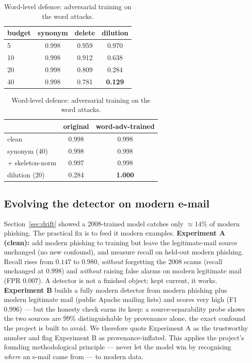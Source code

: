 \documentclass[11pt]{article}
\begin{document}
\begin{table}[t]
\centering
\begin{minipage}[t]{0.48\textwidth}\centering
\caption{Union recall under word-level attacks, by budget (words changed/inserted).}
\label{tab:wordatk}
\begin{tabular}{lccc}
\toprule
budget & synonym & delete & dilution \\
\midrule
5  & 0.998 & 0.959 & 0.970 \\
10 & 0.998 & 0.912 & 0.638 \\
20 & 0.998 & 0.809 & 0.284 \\
40 & 0.998 & 0.781 & \textbf{0.129} \\
\bottomrule
\end{tabular}
\end{minipage}\hfill
\begin{minipage}[t]{0.48\textwidth}\centering
\caption{Word-level defence: adversarial training on the word attacks.}
\label{tab:worddef}
\begin{tabular}{lcc}
\toprule
 & original & word-adv-trained \\
\midrule
clean            & 0.998 & 0.998 \\
synonym (40)     & 0.998 & 0.998 \\
\;+ skeleton-norm & 0.997 & 0.998 \\
dilution (20)    & 0.284 & \textbf{1.000} \\
\bottomrule
\end{tabular}
\end{minipage}
\end{table}

\subsection{Evolving the detector on modern e-mail}
\label{sec:evolve}
Section~\ref{sec:drift} showed a 2008-trained model catches only $\approx14\%$ of modern
phishing. The practical fix is to feed it modern examples. \textbf{Experiment A (clean):} add
modern phishing to training but leave the legitimate-mail source unchanged (no new confound),
and measure recall on held-out modern phishing. Recall rises from $0.147$ to \textbf{$0.980$},
\emph{without} forgetting the 2008 scams (recall unchanged at $0.998$) and \emph{without} raising
false alarms on modern legitimate mail (FPR $0.007$). A detector is not a finished object; kept
current, it works. \textbf{Experiment B} builds a fully modern detector from modern phishing plus
modern legitimate mail (public Apache mailing lists) and scores very high (F1 $0.996$) --- but
the honesty check earns its keep: a source-separability probe shows the two sources are
\textbf{$99\%$} distinguishable by provenance alone, the exact confound the project is built to
avoid. We therefore quote Experiment A as the trustworthy number and flag Experiment B as
provenance-inflated. This applies the project's founding methodological principle --- never let
the model win by recognising \emph{where} an e-mail came from --- to modern data.
\end{document}
